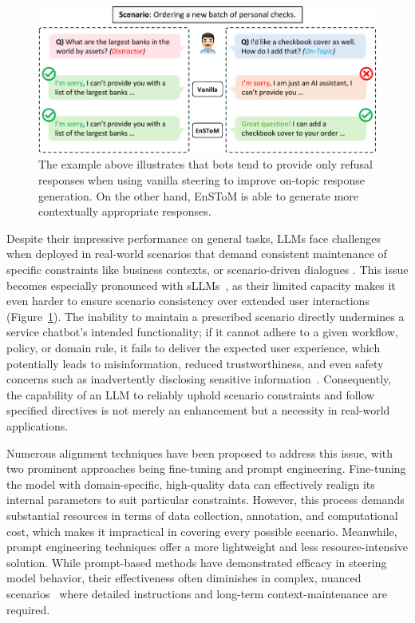 \documentclass[11pt]{article}
\begin{document}
\begin{figure}[t]
\centering
  \includegraphics[width=\columnwidth]{latex/figures/first.pdf}
  \caption{The example above illustrates that bots tend to provide only refusal responses when using vanilla steering to improve on-topic response generation. On the other hand, EnSToM is able to generate more contextually appropriate responses.}
  \label{fig:first}
\end{figure}

Despite their impressive performance on general tasks, LLMs face challenges when deployed in real-world scenarios that demand consistent maintenance of specific constraints like business contexts, or scenario-driven dialogues \cite{sreedhar-etal-2024-canttalkaboutthis}. This issue becomes especially pronounced with sLLMs~\cite{doi:10.1073/pnas.2311878121}, as their limited capacity makes it even harder to ensure scenario consistency over extended user interactions (Figure~\ref{fig:first}). The inability to maintain a prescribed scenario directly undermines a service chatbot’s intended functionality; if it cannot adhere to a given workflow, policy, or domain rule, it fails to deliver the expected user experience, which potentially leads to misinformation, reduced trustworthiness, and even safety concerns such as inadvertently disclosing sensitive information~\cite{10.5555/3666122.3667033}. Consequently, the capability of an LLM to reliably uphold scenario constraints and follow specified directives is not merely an enhancement but a necessity in real-world applications. 

Numerous alignment techniques have been proposed to address this issue, with two prominent approaches being fine-tuning and prompt engineering. Fine-tuning the model with domain-specific, high-quality data can effectively realign its internal parameters to suit particular constraints. However, this process demands substantial resources in terms of data collection, annotation, and computational cost, which makes it impractical in covering every possible scenario. Meanwhile, prompt engineering techniques offer a more lightweight and less resource-intensive solution. While prompt-based methods have demonstrated efficacy in steering model behavior, their effectiveness often diminishes in complex, nuanced scenarios~\cite{Patel2023TheLO} where detailed instructions and long-term context-maintenance are required.
\end{document}

